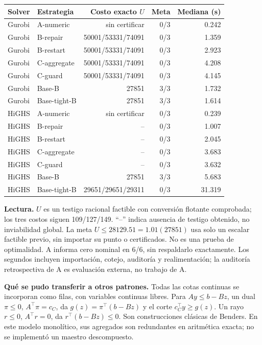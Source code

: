 \documentclass[10pt,a4paper]{article}
\begin{document}
\begin{center}\small
\begin{tabular}{llrrr}\toprule
Solver & Estrategia & Costo exacto $U$ & Meta & Mediana (s)\\\midrule
Gurobi & A-numeric & sin certificar & 0/3 & 0.242 \\
Gurobi & B-repair & 50001/53331/74091 & 0/3 & 1.359 \\
Gurobi & B-restart & 50001/53331/74091 & 0/3 & 2.923 \\
Gurobi & C-aggregate & 50001/53331/74091 & 0/3 & 4.208 \\
Gurobi & C-guard & 50001/53331/74091 & 0/3 & 4.145 \\
Gurobi & Base-B & 27851 & 3/3 & 1.732 \\
Gurobi & Base-tight-B & 27851 & 3/3 & 1.614 \\
HiGHS & A-numeric & sin certificar & 0/3 & 0.239 \\
HiGHS & B-repair & -- & 0/3 & 1.007 \\
HiGHS & B-restart & -- & 0/3 & 2.045 \\
HiGHS & C-aggregate & -- & 0/3 & 3.683 \\
HiGHS & C-guard & -- & 0/3 & 3.632 \\
HiGHS & Base-B & 27851 & 3/3 & 5.683 \\
HiGHS & Base-tight-B & 29651/29651/29311 & 0/3 & 31.319 \\
\bottomrule\end{tabular}
\end{center}
\textbf{Lectura.} $U$ es un testigo racional factible con conversión flotante
comprobada; los tres costos siguen 109/127/149. ``--'' indica ausencia de testigo
obtenido, no inviabilidad global. La meta $U\le28129.51=1.01(27851)$ usa solo
un escalar factible previo, sin importar su punto o certificados. No es una
prueba de optimalidad. A informa cero nominal en 6/6, sin respaldarlo exactamente.
Los segundos incluyen importación, cotejo, auditoría y realimentación; la
auditoría retrospectiva de A es evaluación externa, no trabajo de A.

\newpage
\textbf{Qué se pudo transferir a otros patrones.}
Todas las cotas continuas se incorporan como filas, con variables continuas libres.
Para $Ay\le b-Bz$, un dual $\pi\le0$, $A^\top\pi=c_C$, da
$g(z)=\pi^\top(b-Bz)$ y el corte $c_C^\top y\ge g(z)$.
Un rayo $r\le0$, $A^\top r=0$, da $r^\top(b-Bz)\le0$.
Son construcciones clásicas de Benders. En este modelo monolítico, sus agregados
son redundantes en aritmética exacta; no se implementó un maestro descompuesto.
\end{document}
